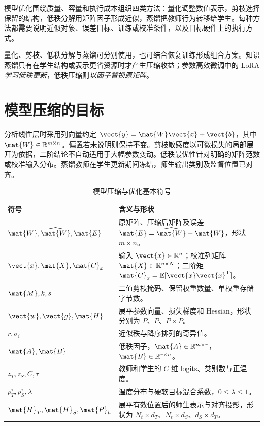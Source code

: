 \documentclass[../textbook.tex]{subfiles}
\begin{document}
\fi
{}
\label{ch:model-compression}

模型优化围绕质量、容量和执行成本组织四类方法：量化调整数值表示，剪枝选择保留的结构，低秩分解用矩阵因子形成近似，蒸馏把教师行为转移给学生。每种方法都需要说明近似对象、误差目标、训练或校准条件，以及目标硬件上的执行方式。

量化、剪枝、低秩分解与蒸馏可分别使用，也可结合恢复训练形成组合方案。知识蒸馏只有在学生结构或表示更省资源时才产生压缩收益；参数高效微调中的 LoRA \emph{学习低秩更新}，低秩压缩则\emph{以因子替换原矩阵}。

\section{模型压缩的目标}

\begin{assumption}[局部近似的边界]
分析线性层时采用列向量约定 $\vect{y}=\mat{W}\vect{x}+\vect{b}$，其中 $\mat{W}\in\mathbb R^{m\times n}$。偏置若未说明则保持不变。剪枝敏感度以可微损失的局部展开为依据，二阶结论不自动适用于大幅参数变动。低秩最优性针对明确的矩阵范数或校准输入分布。蒸馏教师在学生更新期间冻结，师生输出类别及监督位置已对齐。
\end{assumption}

\begin{table}[htbp]
\centering
\caption{模型压缩与优化基本符号}\label{tab:compress-symbols}
\begin{tabular}{ll}
\toprule
符号 & 含义与形状\\
\midrule
$\mat{W},\widehat{\mat{W}},\mat{E}$ & 原矩阵、压缩后矩阵及误差 $\mat{E}=\widehat{\mat{W}}-\mat{W}$，形状 $m\times n$。\\
$\vect{x},\mat{X},\mat{C}_x$ & 输入 $\vect{x}\in\mathbb R^n$；校准列矩阵 $\mat{X}\in\mathbb R^{n\times N}$；二阶矩 $\mat{C}_x=\mathbb E[\vect{x}\vect{x}^{\mathrm{T}}]$。\\
$\mat{M},k,s$ & 二值剪枝掩码、保留权重数量、单权重存储字节数。\\
$\vect{w},\vect{g},\mat{H}$ & 展平参数向量、损失梯度和 Hessian，形状分别为 $P$、$P$、$P\times P$。\\
$r,\sigma_i$ & 近似秩与降序排列的奇异值。\\
$\mat{A},\mat{B}$ & 低秩因子，$\mat{A}\in\mathbb R^{m\times r}$，$\mat{B}\in\mathbb R^{r\times n}$。\\
$z_T,z_S,C,\tau$ & 教师和学生的 $C$ 维 logits、类别数与正温度。\\
$p_T^\tau,p_S^\tau,\lambda$ & 温度分布与硬软目标混合系数，$0\leq\lambda\leq1$。\\
$\mat{H}_T,\mat{H}_S,\mat{P}_h$ & 展平有效位置后的师生表示与对齐投影，形状为 $N_t\times d_T$、$N_t\times d_S$、$d_S\times d_T$。\\
\bottomrule
\end{tabular}
\end{table}
\end{document}
